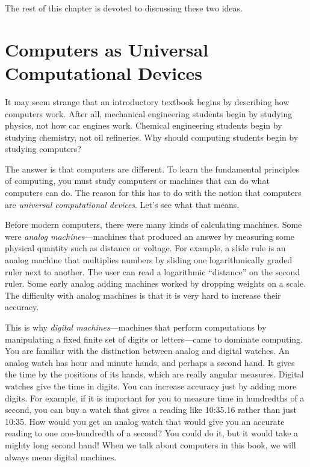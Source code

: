 \documentclass{patt}
\begin{document}
The rest of this chapter is devoted to discussing these two ideas.

\vspace{-6pt}
\section{Computers as Universal Computational Devices}

It may seem strange that an introductory textbook begins by describing
how computers work.  After all, mechanical engineering students begin
by studying physics, not how car engines work.  Chemical engineering
students begin by studying chemistry, not oil refineries.  Why should
computing students begin by studying computers?

The answer is that computers are different.
To learn the fundamental principles
of computing, you must study computers or machines that can do what
computers can do.  The reason for this has to do with the notion that
computers are
{\em universal computational devices}.  Let's see what that means.



Before modern computers, there were many kinds of
calculating machines.  Some were {\em analog machines}---machines that
produced an answer by measuring some physical quantity such as
distance or voltage.  For example, a slide rule is an analog machine
that multiplies numbers by sliding one logarithmically graded ruler
next to another.  The user can read a logarithmic ``distance'' on the
second ruler.  Some early analog adding machines worked by dropping
weights on a scale.  The difficulty with analog machines is that it is
very hard to increase their accuracy.

This is why {\em digital machines}---machines that perform
computations by manipulating a fixed finite set of digits or
letters---came to dominate computing.  You are familiar with the
distinction between analog and digital watches.  An analog watch has
hour and minute hands, and perhaps a second hand.  It gives the time
by the positions of its hands, which are really angular measures.
Digital watches give the time in digits.  You can increase accuracy
just by adding more digits.  For example, if it is important for you
to measure time in hundredths of a second, you can buy a watch that
gives a reading like 10:35.16 rather than just 10:35.  How would you
get an analog watch that would give you an accurate reading to one
one-hundredth of a second?  You could do it, but it would take a
mighty long second hand!  When we talk about computers in this book,
we will always mean digital machines.
\end{document}
